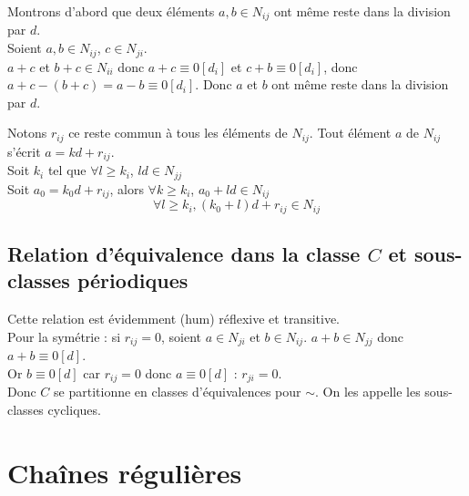 \begin{dem}
Montrons d'abord que deux éléments $a,b\in N_{ij}$ ont même reste dans la division par $d$.\\
Soient $a,b\in N_{ij}$, $c\in N_{ji}$.\\
$a+c$ et $b+c\in N_{ii}$ donc $a+c\equiv 0[d_i]$ et $c+b\equiv 0[d_i]$, donc $a+c-(b+c)=a-b\equiv 0[d_i]$. Donc $a$ et $b$ ont même reste dans la division par $d$.

\bigskip
Notons $r_{ij}$ ce reste commun à tous les éléments de $N_{ij}$. Tout élément $a$ de $N_{ij}$ s'écrit $a=kd+r_{ij}$.\\
Soit $k_i$ tel que $\forall l\geq k_i$, $ld\in N_{jj}$\\
Soit $a_0=k_0d+r_{ij}$, alors $\forall k\geq k_i$, $a_0+ld\in N_{ij}$\\
\[\forall l\geq k_i, (k_0+l)d+r_{ij}\in N_{ij}\]
\end{dem}

\subsection{Relation d'équivalence dans la classe $C$ et sous-classes périodiques}

Cette relation est évidemment (hum) réflexive et transitive.\\
Pour la symétrie : si $r_{ij}=0$, soient $a\in N_{ji}$ et $b\in N_{ij}$. $a+b\in N_{jj}$ donc $a+b\equiv 0[d]$. \\
Or $b\equiv 0[d]$ car $r_{ij}=0$ donc $a\equiv 0[d]$ : $r_{ji}=0$.\\
Donc $C$ se partitionne en classes d'équivalences pour $\sim$. On les appelle les sous-classes cycliques.


\section{Chaînes régulières}

